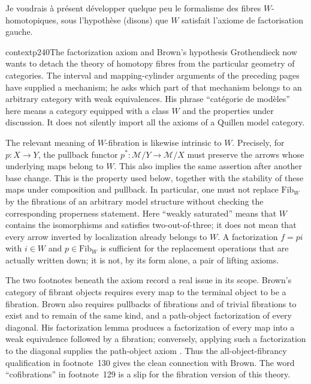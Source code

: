 Je voudrais à présent développer quelque peu le formalisme des fibres $W$-homotopiques, sous l'hypothèse (disons) que $W$ satisfait l'axiome de factorisation gauche.

\begin{dcomment}{context}{p240}{The factorization axiom and Brown's hypothesis}
Grothendieck now wants to detach the theory of homotopy fibres from the particular geometry of categories. The interval and mapping-cylinder arguments of the preceding pages have supplied a mechanism; he asks which part of that mechanism belongs to an arbitrary category with weak equivalences. His phrase ``catégorie de modèles'' here means a category equipped with a class $W$ and the properties under discussion. It does not silently import all the axioms of a Quillen model category.

The relevant meaning of $W$-fibration is likewise intrinsic to $W$. Precisely, for $p:X\to Y$, the pullback functor $p^*:\mathcal M/Y\to\mathcal M/X$ must preserve the arrows whose underlying maps belong to $W$. This also implies the same assertion after another base change. This is the property used below, together with the stability of these maps under composition and pullback. In particular, one must not replace $\mathrm{Fib}_W$ by the fibrations of an arbitrary model structure without checking the corresponding properness statement. Here ``weakly saturated'' means that $W$ contains the isomorphisms and satisfies two-out-of-three; it does not mean that every arrow inverted by localization already belongs to $W$. A factorization $f=pi$ with $i\in W$ and $p\in\mathrm{Fib}_W$ is sufficient for the replacement operations that are actually written down; it is not, by its form alone, a pair of lifting axioms.

The two footnotes beneath the axiom record a real issue in its scope. Brown's category of fibrant objects requires every map to the terminal object to be a fibration. Brown also requires pullbacks of fibrations and of trivial fibrations to exist and to remain of the same kind, and a path-object factorization of every diagonal. His factorization lemma produces a factorization of every map into a weak equivalence followed by a fibration; conversely, applying such a factorization to the diagonal supplies the path-object axiom \citep[Part~I, \S1, pp.~420--422]{Brown1973}. Thus the all-object-fibrancy qualification in footnote~130 gives the clean connection with Brown. The word ``cofibrations'' in footnote~129 is a slip for the fibration version of this theory.


\end{dcomment}
